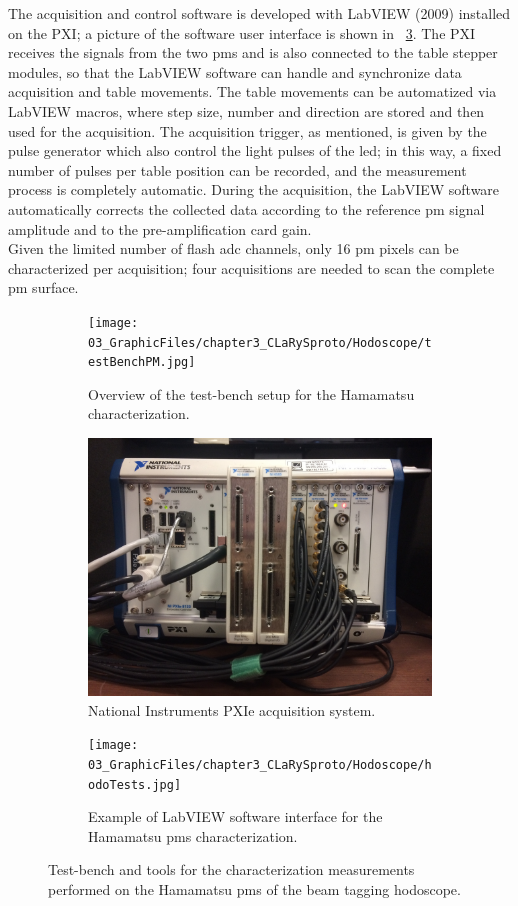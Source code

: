 The acquisition and control software is developed with LabVIEW (2009) installed on the PXI; a picture of the software user interface is shown in \figurename~\ref{chap3::fig::hodo_LabView}. The PXI receives the signals from the two \glspl{pm} and is also connected to the table stepper modules, so that the LabVIEW software can handle and synchronize data acquisition and table movements. The table movements can be automatized via LabVIEW macros, where step size, number and direction are stored and then used for the acquisition. The acquisition trigger, as mentioned, is given by the pulse generator which also control the light pulses of the \gls{led}; in this way, a fixed number of pulses per table position can be recorded, and the measurement process is completely automatic. During the acquisition, the LabVIEW software automatically corrects the collected data according to the reference \gls{pm} signal amplitude and to the pre-amplification card gain.\\
Given the limited number of flash \gls{adc} channels, only 16 \gls{pm} pixels can be characterized per acquisition; four acquisitions are needed to scan the complete \gls{pm} surface.\\
 
\begin{figure}
\begin{subfigure}[t]{1\textwidth}
\centering
\texttt{[image: 03\_GraphicFiles/chapter3\_CLaRySproto/Hodoscope/testBenchPM.jpg]}
\caption{Overview of the test-bench setup for the Hamamatsu  characterization.}
\label{chap3::fig::hodo_testBenchPM}
\end{subfigure}
\newline
\begin{subfigure}[t]{.5\textwidth}
\centering
\includegraphics[width=1\textwidth, height = 5.cm]{03_GraphicFiles/chapter3_CLaRySproto/Electronics_Acquisition/PXI_ipnl.jpg}
\caption{National Instruments PXIe acquisition system.}
\label{chap3::fig::PXI_NI}
\end{subfigure}
\begin{subfigure}[t]{.5\textwidth}
\centering
\texttt{[image: 03\_GraphicFiles/chapter3\_CLaRySproto/Hodoscope/hodoTests.jpg]}
\caption{Example of LabVIEW software interface for the Hamamatsu 	\glspl{pm} characterization.}
\label{chap3::fig::hodo_LabView}
\end{subfigure}
\caption{Test-bench and tools for the characterization measurements performed on the Hamamatsu \glspl{pm} of the beam tagging hodoscope.}
\label{chap3::fig::hodoPMtest}
\end{figure}

